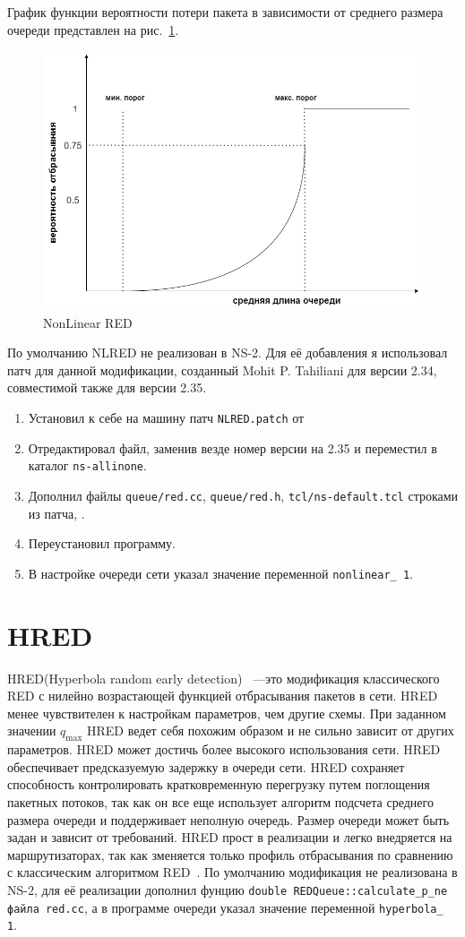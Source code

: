График функции вероятности потери пакета в зависимости от среднего
размера очереди представлен на  рис.~\ref{fig:2.4}.

\begin{figure}[!h]
  \centering
  \includegraphics[width=0.7\linewidth]{image/nlred.png}
  \caption{NonLinear RED}
  \label{fig:2.4}
\end{figure}

По умолчанию NLRED не реализован в NS-2. Для её добавления я использовал патч для данной модификации, созданный Mohit
  P. Tahiliani для версии 2.34, совместимой также для версии 2.35. 
  
\begin{enumerate}
\item Установил к себе на машину патч \verb|NLRED.patch| от 
\item Отредактировал файл, заменив везде номер версии на 2.35 и переместил в каталог \verb|ns-allinone|.
\item Дополнил файлы \verb|queue/red.cc|, \verb|queue/red.h|, \verb|tcl/ns-default.tcl| строками из патча, .
\item Переустановил программу.
\item В настройке очереди сети указал значение переменной \verb|nonlinear_ 1|.
\end{enumerate}
 
 
\section{HRED} 
 
HRED(Hyperbola random early detection) ~---это модификация классического RED с нилейно возрастающей функцией отбрасывания пакетов в сети.
HRED менее чувствителен к настройкам параметров, чем другие схемы. При заданном значении $q_{\max}$ HRED ведет себя похожим образом и не сильно зависит от других параметров.
HRED может достичь более высокого использования сети. HRED обеспечивает предсказуемую задержку в очереди сети. HRED сохраняет способность контролировать кратковременную перегрузку путем поглощения пакетных потоков, так как он все еще использует алгоритм подсчета среднего размера очереди и поддерживает неполную очередь. Размер очереди может быть задан и зависит от требований. HRED прост в реализации и легко внедряется на маршрутизаторах, так как зменяется только профиль отбрасывания по сравнению с классическим алгоритмом RED~\citep{HRED}. По умолчанию модификация не реализована в NS-2, для её реализации дополнил фунцию \verb|double REDQueue::calculate_p_ne файла red.cc|, а в программе очереди указал значение переменной \verb|hyperbola_ 1|.
 
